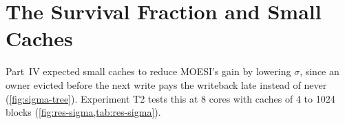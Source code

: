 \section{The Survival Fraction and Small Caches}
\label{sec:res-sigma}
%

Part~IV expected small caches to reduce MOESI's gain by lowering $\sigma$, since an
owner evicted before the next write pays the writeback late instead of never
(\cref{fig:sigma-tree}). Experiment T2 tests this at 8 cores with caches of 4 to
1024 blocks (\cref{fig:res-sigma,tab:res-sigma}).

